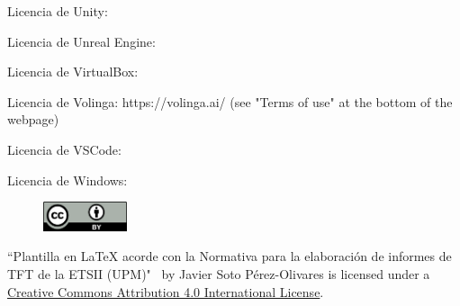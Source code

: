 \documentclass[a4paper, 12pt, spanish, twoside]{article}
\begin{document}
Licencia de Unity: 

Licencia de Unreal Engine: 

Licencia de VirtualBox: 

Licencia de Volinga: https://volinga.ai/ (see "Terms of use" at the bottom of the webpage)

Licencia de VSCode: 

Licencia de Windows: 

\begin{figure}
    \vspace{-\baselineskip}
    \href{http://creativecommons.org/licenses/by/4.0/}{\includegraphics[width=0.22\textwidth]{licencias/cc-by.png}}
\end{figure} 

``Plantilla en LaTeX acorde con la Normativa para la elaboración de informes de TFT de la ETSII (UPM)" \ by Javier Soto Pérez-Olivares is licensed under a \href{http://creativecommons.org/licenses/by/4.0/}{Creative Commons Attribution 4.0 International License}.

\clearpage



\end{document}

